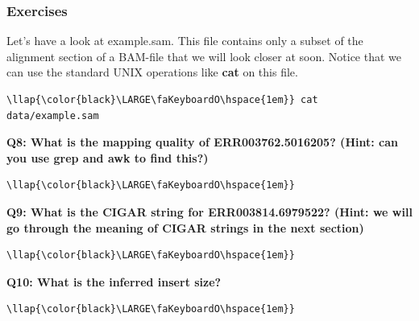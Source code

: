 \documentclass[11pt]{article}
\begin{document}
\hypertarget{exercises}{%
\subsubsection{Exercises}\label{exercises}}

Let's have a look at example.sam. This file contains only a subset of
the alignment section of a BAM-file that we will look closer at soon.
Notice that we can use the standard UNIX operations like \textbf{cat} on
this file.

\begin{terminalinput}
\begin{Verbatim}[commandchars=\\\{\}]
\llap{\color{black}\LARGE\faKeyboardO\hspace{1em}} cat data/example.sam
\end{Verbatim}
\end{terminalinput}

    \textbf{Q8: What is the mapping quality of ERR003762.5016205? (Hint: can
you use grep and awk to find this?)}

\begin{terminalinput}
\begin{Verbatim}[commandchars=\\\{\}]
\llap{\color{black}\LARGE\faKeyboardO\hspace{1em}}
\end{Verbatim}
\end{terminalinput}

    \textbf{Q9: What is the CIGAR string for ERR003814.6979522? (Hint: we
will go through the meaning of CIGAR strings in the next section)}

\begin{terminalinput}
\begin{Verbatim}[commandchars=\\\{\}]
\llap{\color{black}\LARGE\faKeyboardO\hspace{1em}}
\end{Verbatim}
\end{terminalinput}

    \textbf{Q10: What is the inferred insert size?}

\begin{terminalinput}
\begin{Verbatim}[commandchars=\\\{\}]
\llap{\color{black}\LARGE\faKeyboardO\hspace{1em}}
\end{Verbatim}
\end{terminalinput}
\end{document}
